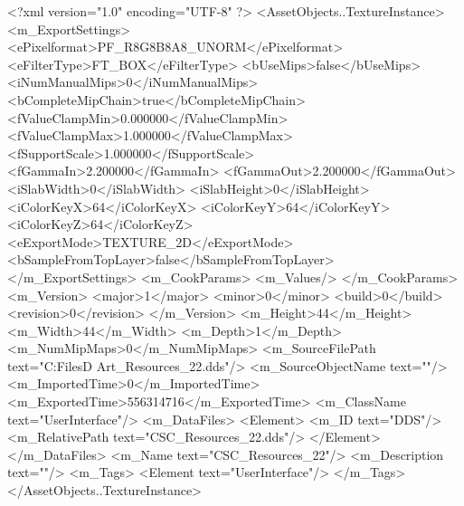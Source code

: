 <?xml version="1.0" encoding="UTF-8" ?>
<AssetObjects..TextureInstance>
	<m_ExportSettings>
		<ePixelformat>PF_R8G8B8A8_UNORM</ePixelformat>
		<eFilterType>FT_BOX</eFilterType>
		<bUseMips>false</bUseMips>
		<iNumManualMips>0</iNumManualMips>
		<bCompleteMipChain>true</bCompleteMipChain>
		<fValueClampMin>0.000000</fValueClampMin>
		<fValueClampMax>1.000000</fValueClampMax>
		<fSupportScale>1.000000</fSupportScale>
		<fGammaIn>2.200000</fGammaIn>
		<fGammaOut>2.200000</fGammaOut>
		<iSlabWidth>0</iSlabWidth>
		<iSlabHeight>0</iSlabHeight>
		<iColorKeyX>64</iColorKeyX>
		<iColorKeyY>64</iColorKeyY>
		<iColorKeyZ>64</iColorKeyZ>
		<eExportMode>TEXTURE_2D</eExportMode>
		<bSampleFromTopLayer>false</bSampleFromTopLayer>
	</m_ExportSettings>
	<m_CookParams>
		<m_Values/>
	</m_CookParams>
	<m_Version>
		<major>1</major>
		<minor>0</minor>
		<build>0</build>
		<revision>0</revision>
	</m_Version>
	<m_Height>44</m_Height>
	<m_Width>44</m_Width>
	<m_Depth>1</m_Depth>
	<m_NumMipMaps>0</m_NumMipMaps>
	<m_SourceFilePath text="C:\Users\Shadow\Desktop\Working Files\2D Art\Resources\CSC_Resources_22.dds"/>
	<m_SourceObjectName text=""/>
	<m_ImportedTime>0</m_ImportedTime>
	<m_ExportedTime>556314716</m_ExportedTime>
	<m_ClassName text="UserInterface"/>
	<m_DataFiles>
		<Element>
			<m_ID text="DDS"/>
			<m_RelativePath text="CSC_Resources_22.dds"/>
		</Element>
	</m_DataFiles>
	<m_Name text="CSC_Resources_22"/>
	<m_Description text=""/>
	<m_Tags>
		<Element text="UserInterface"/>
	</m_Tags>
</AssetObjects..TextureInstance>
